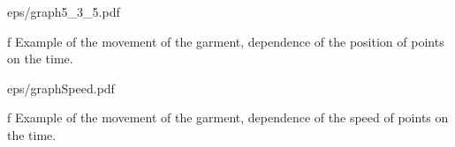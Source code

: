 \eject

\medskip {}
\picw=18cm 
\cinspic eps/graph5_3_5.pdf
\caption/f Example of the movement of the garment, dependence of the position of points on the time.
\medskip

\medskip {}
\picw=18cm 
\cinspic eps/graphSpeed.pdf
\caption/f Example of the movement of the garment, dependence of the speed of points on the time.
\medskip
